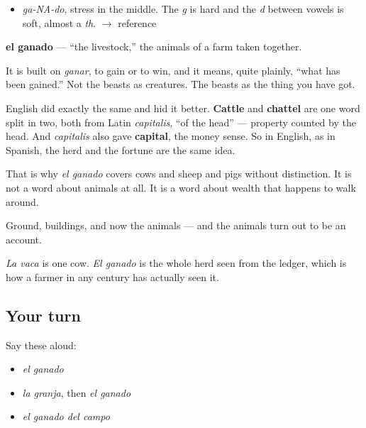 \begin{sounds}
\begin{itemize}
\raggedright
  \item \emph{ga-NA-do}, stress in the middle. The \emph{g} is hard and the \emph{d} between vowels is soft, almost a \emph{th}. $\to$ reference
\end{itemize}
\end{sounds}

\begin{cousinweb}
\textbf{el ganado} — \textquotedblleft{}the livestock,\textquotedblright{} the animals of a farm taken together.

It is built on \emph{ganar}, to gain or to win, and it means, quite plainly, \textquotedblleft{}what has been gained.\textquotedblright{} Not the beasts as creatures. The beasts as the thing you have got.

English did exactly the same and hid it better. \textbf{Cattle} and \textbf{chattel} are one word split in two, both from Latin \emph{capitalis}, \textquotedblleft{}of the head\textquotedblright{} — property counted by the head. And \emph{capitalis} also gave \textbf{capital}, the money sense. So in English, as in Spanish, the herd and the fortune are the same idea.

That is why \emph{el ganado} covers cows and sheep and pigs without distinction. It is not a word about animals at all. It is a word about wealth that happens to walk around.
\end{cousinweb}

\begin{grammarlens}[title={What you've built}]
Ground, buildings, and now the animals — and the animals turn out to be an account.

\emph{La vaca} is one cow. \emph{El ganado} is the whole herd seen from the ledger, which is how a farmer in any century has actually seen it.
\end{grammarlens}

\subsection*{Your turn}
Say these aloud:

\begin{itemize}
\raggedright
  \item \emph{el ganado}
  \item \emph{la granja}, then \emph{el ganado}
  \item \emph{el ganado del campo}
\end{itemize}

